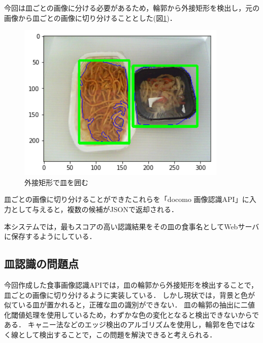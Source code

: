 \documentclass[../report]{subfiles}
\begin{document}
今回は皿ごとの画像に分ける必要があるため，輪郭から外接矩形を検出し，元の画像から皿ごとの画像に切り分けることとした(図\ref{fig:6-bounding})．

\begin{figure}[htbp]
    \begin{center}
        \includegraphics[width=10cm]{imgs/6_bounding.png}
        \caption{外接矩形で皿を囲む}
        \label{fig:6-bounding}
    \end{center}
\end{figure}

皿ごとの画像に切り分けることができたこれらを「docomo 画像認識API」に入力として与えると，複数の候補がJSONで返却される．

本システムでは，最もスコアの高い認識結果をその皿の食事名としてWebサーバに保存するようにしている．

\subsection{皿認識の問題点}
今回作成した食事画像認識APIでは，皿の輪郭から外接矩形を検出することで，皿ごとの画像に切り分けるように実装している．
しかし現状では，背景と色が似ている皿が置かれると，正確な皿の識別ができない．
皿の輪郭の抽出に二値化閾値処理を使用しているため，わずかな色の変化となると検出できないからである．
キャニー法などのエッジ検出のアルゴリズムを使用し，輪郭を色ではなく線として検出することで，この問題を解決できると考えられる．
\end{document}
